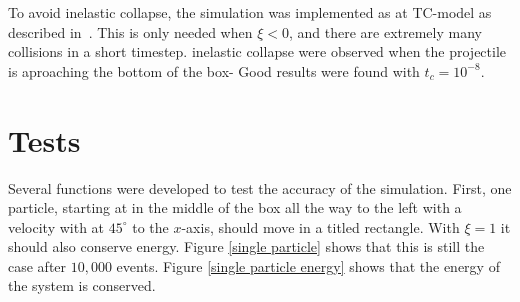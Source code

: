 \documentclass{article}
\begin{document}
            To avoid inelastic collapse, the simulation was implemented as at TC-model as described in~\cite{TC}. This is only needed when $\xi<0$, and there are extremely many collisions in a short timestep. inelastic collapse were observed when the projectile is aproaching the bottom of the box- Good results were found with $t_c = 10^{-8}$.

    \section*{Tests}
        Several functions were developed to test the accuracy of the simulation. First, one particle, starting at in the middle of the box all the way to the left with a velocity with at $45^\circ$ to the $x$-axis, should move in a titled rectangle. With $\xi=1$ it should also conserve energy. Figure \ref{single particle} shows that this is still the case after $10,000$ events. Figure \ref{single particle energy} shows that the energy of the system is conserved.
\end{document}
